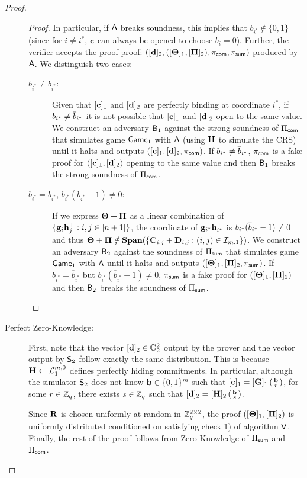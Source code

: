 \begin{proof}
\begin{description}
\begin{proof}
In particular, if $\mathsf{A}$ breaks soundness, this implies that $b_{i^*} \notin \{0,1\}$ (since for $i\neq i^*$, 
$\mathbf{c}$ can always be opened to 
  choose $b_i=0$). Further, the verifier accepts the proof proof:
$ (
        [\mathbf{d}]_2,
        ([\mathbf{{\Theta}}]_1, [\mathbf{{\Pi}}]_2), 
        \pi_{\mathsf{com}},\pi_{\mathsf{sum}} )$
  produced by $\mathsf{A}$.
We distinguish two cases:
\begin{description}
\item[$b_{i^*} \neq \overline{b}_{i^*}$:] Given that $[\mathbf{c}]_1$ and $[\mathbf{d}]_2$ are perfectly binding at coordinate $i^*$, if $b_{i^*}\neq\overline{b}_{i^*}$ it is not possible that $[\mathbf{c}]_1$ and $[\mathbf{d}]_2$ open to the same value. We construct an adversary $\mathsf{B}_1$ against the strong soundness 
of $\Pi_{\mathsf{com}}$ that simulates game $\mathsf{Game}_1$ with $\mathsf{A}$ (using $\mathbf{{H}}$ to simulate the CRS) until it halts and outputs $([\mathbf{c}]_1,[\mathbf{d}]_2,\pi_{\mathsf{com}})$. If $b_{i^*}\neq\overline{b}_{i^*}$, $\pi_{\mathsf{com}}$ is a fake proof for $([\mathbf{c}]_1,[\mathbf{d}]_2)$ opening to the same value and then $\mathsf{B}_1$ breaks the strong soundness of $\Pi_{\mathsf{com}}$.
\item[$b_{i^*} = \overline{b}_{i^*}$, 
$b_{i^*}(\overline{b}_{i^*} -1) \neq 0$:]
If we express $\mathbf{{\Theta}}+\mathbf{{\Pi}}$
as a linear combination of $\{\mathbf{g}_{i}\mathbf{h}_{j}^{\top}:i,j\in[n+1]\}$, the coordinate of
$\mathbf{g}_{i^*}\mathbf{h}_{i^*}^\top$ is $b_{i^*}(\overline{b}_{i^*}-1)\neq 0$ and thus $\mathbf{{\Theta}}+\mathbf{{\Pi}}\notin\mathbf{Span}(\{\mathbf{{C}}_{i,j}+\mathbf{{D}}_{i,j}:(i,j)\in\mathcal{I}_{m,1}\})$. We construct an adversary $\mathsf{B}_2$ against the soundness of $\Pi_{\mathsf{sum}}$ that simulates game $\mathsf{Game}_1$ with $\mathsf{A}$ until it halts and outputs $([\mathbf{{\Theta}}]_1,[\mathbf{{\Pi}}]_2,\pi_{\mathsf{sum}})$. If $b_{i^*} = \overline{b}_{i^*}$ but $b_{i^*}(\overline{b}_{i^*} -1) \neq 0$, $\pi_{\mathsf{sum}}$ is a fake proof for $([\mathbf{{\Theta}}]_1,[\mathbf{{\Pi}}]_2)$ and then $\mathsf{B}_2$ breaks the soundness of $\Pi_{\mathsf{sum}}$.
\end{description}
\end{proof}

\item[Perfect Zero-Knowledge:] First, note that the vector $[\mathbf{d}]_2 \in \mathbb{G}_2^2$ output by the prover and the vector output by $\mathsf{S}_2$ follow exactly the same distribution. This is because $\mathbf{{H}}\gets\mathcal{L}_1^{m,0}$ defines perfectly hiding commitments. In particular, although the simulator $\mathsf{S}_2$ does not know $\mathbf{b} \in \{0,1\}^{m}$ such that $[\mathbf{c}]_1=[\mathbf{{G}}]_1\left(\begin{smallmatrix}\mathbf{b}\\r\end{smallmatrix}\right)$, for some $r\in\mathbb{Z}_q$, 
there exists $s \in \mathbb{Z}_q$ such that $[\mathbf{d}]_2=[\mathbf{{H}}]_2\left(\begin{smallmatrix}\mathbf{b}\\ s\end{smallmatrix}\right)$. 

Since $\mathbf{{R}}$ is chosen uniformly at random in $\mathbb{Z}_q^{2 \times 2}$, the proof $([\mathbf{{\Theta}}]_1, [\mathbf{{\Pi}}]_2)$ is uniformly distributed conditioned on satisfying check 1) of algorithm $\mathsf{V}$.
 Finally, the rest of the proof follows from Zero-Knowledge of $\Pi_{\mathsf{sum}}$ and $\Pi_{\mathsf{com}}$.
\end{description}
\end{proof}
